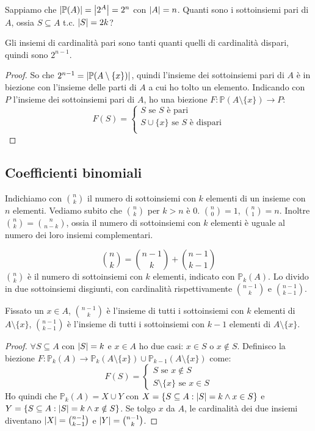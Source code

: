 \begin{prop}
Sappiamo che $\left\lvert{\mathbb{P}(A)}\right\rvert = \left\lvert{2^A}\right\rvert = 2^n$ con $\left\lvert{A}\right\rvert = n$. Quanti sono i sottoinsiemi pari di $A$, ossia $S \subseteq A $ t.c. $\left\lvert{S}\right\rvert = 2k$?

Gli insiemi di cardinalit\`a pari sono tanti quanti quelli di cardinalit\`a dispari, quindi sono $2^{n-1}$.
\end{prop}
\begin{proof}
So che $2^{n-1} = \left\lvert{\mathbb{P}(A \setminus \{x\})}\right\rvert$, quindi l'insieme dei sottoinsiemi pari di $A$ \`e in biezione con l'insieme delle parti di $A$ a cui ho tolto un elemento. Indicando con $P$ l'insieme dei sottoinsiemi pari di $A$, ho una biezione $F : \mathbb{P}(A \setminus \{x\}) \to P$:
\[
F(S) = 
\begin{cases}
S \text{ se } S \text{ \`e pari} \\
S \cup \{ x \} \text{ se } S \text{ \`e dispari} \\
\end{cases}
\]
\end{proof}

\subsection{Coefficienti  binomiali}
Indichiamo con $\binom{n}{k}$ il numero di sottoinsiemi con $k$ elementi di un insieme con $n$ elementi. Vediamo subito che $\binom{n}{k}$ per $k > n$ \`e 0. $\binom{n}{0} = 1$, $\binom{n}{1} = n$. Inoltre $\binom{n}{k} = \binom{n}{n-k}$, ossia il numero di sottoinsiemi con $k$ elementi \`e uguale al numero dei loro insiemi complementari.
\begin{prop}
\begin{equation}
\binom{n}{k} = \binom{n-1}{k} + \binom{n-1}{k-1}
\end{equation}
$\binom{n}{k}$ \`e il numero di sottoinsiemi con $k$ elementi, indicato con $\mathbb{P}_{k}(A)$. Lo divido in due sottoinsiemi disgiunti, con cardinalit\`a rispettivamente $\binom{n-1}{k}$ e $\binom{n-1}{k-1}$.

Fissato un $x \in A$, $\binom{n-1}{k}$ \`e l'insieme di tutti i sottoinsiemi con $k$ elementi di $A \setminus \{ x \}$, $\binom{n-1}{k-1}$ \`e l'insieme di tutti i sottoinsiemi con $k - 1$ elementi di $A \setminus \{x \}$.
\end{prop}
\begin{proof}
$\forall S \subseteq A$ con $\left\lvert{S}\right\rvert = k$ e $x \in A$ ho due casi: $x \in S$ o $x \notin S$. Definisco la biezione $F : \mathbb{P}_k (A) \to \mathbb{P}_k (A \setminus \{ x \}) \cup \mathbb{P}_{k - 1} (A \setminus \{ x \})$ come:
\[
F (S) =
\begin{cases}
S \text{ se } x \notin S \\
S \setminus \{ x \} \text{ se } x \in S
\end{cases}
\]
Ho quindi che $\mathbb{P}_k (A) = X \cup Y$ con $X = \{ S \subseteq A : \left\lvert{S}\right\rvert = k \land x \in S \}$ e $Y = \{ S \subseteq A : \left\lvert{S}\right\rvert = k \land x \notin S\}$. Se tolgo $x$ da $A$, le cardinalit\`a dei due insiemi diventano $\left\lvert{X}\right\rvert = \binom{n - 1}{k - 1}$ e $\left\lvert{Y}\right\rvert = \binom{n - 1}{k}$.
\end{proof}

